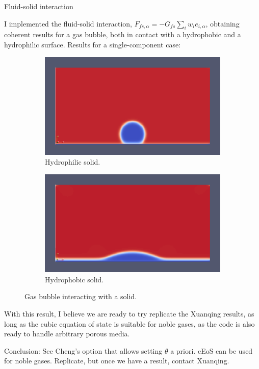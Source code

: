 \documentclass[8pt]{beamer}
\begin{document}
	\begin{frame}{Fluid-solid interaction}
		
		I implemented the fluid-solid interaction, $F_{fs,\alpha} = - G_{fs} \sum_i w_i e_{i,\alpha} $, obtaining coherent results for a gas bubble, both in contact with a hydrophobic and a hydrophilic surface. Results for a single-component case:
		
		\begin{figure}[h]
			\centering
			\begin{subfigure}{.5\textwidth}
				\centering
				\includegraphics[width=1\linewidth]{pics/solidForce.png}
				\caption{Hydrophilic solid.}
			\end{subfigure}%
			\begin{subfigure}{.5\textwidth}
				\centering
				\includegraphics[width=1\linewidth]{pics/solidForce2.png}
				\caption{Hydrophobic solid.}
			\end{subfigure}
			\caption{Gas bubble interacting with a solid.}
		\end{figure}	
	
		With this result, I believe we are ready to try replicate the Xuanqing results, as long as the cubic equation of state is suitable for noble gases, as the code is also ready to handle arbitrary porous media.  
		
		{\color{red} Conclusion: See Cheng's option that allows setting $\theta$ a priori. cEoS can be used for noble gases. Replicate, but once we have a result, contact Xuanqing. }
	\end{frame}
	
\end{document}
